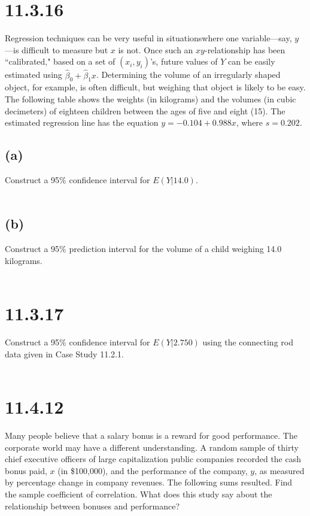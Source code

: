 \documentclass{article}
\begin{document}
{\section*{11.3.16}
Regression techniques can be very useful in situationswhere one variable—say, \(y\)—is difficult to measure but \(x\) is not. Once such an \(xy\)-relationship has been “calibrated," based on a set of \((x_i, y_i)\)'s, future values of \(Y\) can be easily estimated using \(\hat{\beta}_0 + \hat{\beta}_1x\). Determining the volume of an irregularly shaped object, for example, is often difficult, but weighing that object is likely to be easy. The following table shows the weights (in kilograms) and the volumes (in cubic decimeters) of eighteen children between the ages of five and eight (15). The estimated regression line has the equation \(y = -0.104+0.988x\), where \(s = 0.202\).

\subsection*{(a)} 
Construct a 95\% confidence interval for \(E(Y | 14.0)\).
\\
\\

\subsection*{(b)} 
Construct a 95\% prediction interval for the volume of a child weighing 14.0 kilograms.
\\
\\


\section*{11.3.17}
Construct a 95\% confidence interval for \(E(Y | 2.750) \) using the connecting rod data given in Case Study 11.2.1.
\\
\\


\section*{11.4.12}
Many people believe that a salary bonus is a reward for good performance. The corporate world may have a different understanding. A random sample of thirty chief executive officers of large capitalization public companies recorded the cash bonus paid, \(x\) (in \$100,000), and the performance of the company, \(y\), as measured by percentage change in company revenues. The following sums resulted. Find the sample coefficient of correlation. What does this study say about the relationship between bonuses and performance?
\\
\\

}
\end{document}
